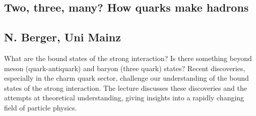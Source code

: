 \subsection*{Two, three, many? How quarks make hadrons}
\subsection*{N. Berger, Uni Mainz}
\noindent What are the bound states of the strong interaction? Is there something beyond meson (quark-antiquark) and baryon (three quark) states? Recent discoveries, especially in the charm quark sector, challenge our understanding of the bound states of the strong interaction. The lecture discusses these discoveries and the attempts at theoretical understanding, giving insights into a rapidly changing field of particle physics. 
